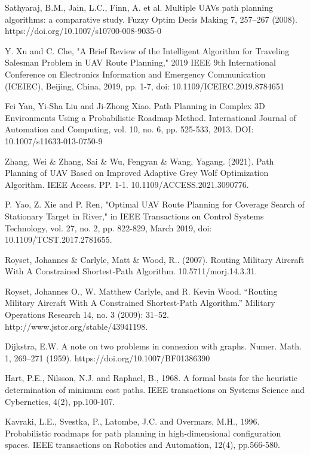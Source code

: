 \documentclass[conference]{IEEEtran}
\begin{document}
\begin{thebibliography}{00}

 Sathyaraj, B.M., Jain, L.C., Finn, A. et al. Multiple UAVs path planning algorithms: a comparative study. Fuzzy Optim Decis Making 7, 257–267 (2008). https://doi.org/10.1007/s10700-008-9035-0

 Y. Xu and C. Che, "A Brief Review of the Intelligent Algorithm for Traveling Salesman Problem in UAV Route Planning," 2019 IEEE 9th International Conference on Electronics Information and Emergency Communication (ICEIEC), Beijing, China, 2019, pp. 1-7, doi: 10.1109/ICEIEC.2019.8784651

 Fei Yan, Yi-Sha Liu and Ji-Zhong Xiao. Path Planning in Complex 3D Environments Using a Probabilistic Roadmap Method. International Journal of Automation and Computing, vol. 10, no. 6, pp. 525-533, 2013. DOI:  10.1007/s11633-013-0750-9

 Zhang, Wei \& Zhang, Sai \& Wu, Fengyan \& Wang, Yagang. (2021). Path Planning of UAV Based on Improved Adaptive Grey Wolf Optimization Algorithm. IEEE Access. PP. 1-1. 10.1109/ACCESS.2021.3090776. 

 P. Yao, Z. Xie and P. Ren, "Optimal UAV Route Planning for Coverage Search of Stationary Target in River," in IEEE Transactions on Control Systems Technology, vol. 27, no. 2, pp. 822-829, March 2019, doi: 10.1109/TCST.2017.2781655.

 Royset, Johannes \& Carlyle, Matt \& Wood, R.. (2007). Routing Military Aircraft With A Constrained Shortest-Path Algorithm. 10.5711/morj.14.3.31. 

 Royset, Johannes O., W. Matthew Carlyle, and R. Kevin Wood. “Routing Military Aircraft With A Constrained Shortest-Path Algorithm.” Military Operations Research 14, no. 3 (2009): 31–52. http://www.jstor.org/stable/43941198.

 Dijkstra, E.W. A note on two problems in connexion with graphs. Numer. Math. 1, 269–271 (1959). https://doi.org/10.1007/BF01386390

 Hart, P.E., Nilsson, N.J. and Raphael, B., 1968. A formal basis for the heuristic determination of minimum cost paths. IEEE transactions on Systems Science and Cybernetics, 4(2), pp.100-107.

 Kavraki, L.E., Svestka, P., Latombe, J.C. and Overmars, M.H., 1996. Probabilistic roadmaps for path planning in high-dimensional configuration spaces. IEEE transactions on Robotics and Automation, 12(4), pp.566-580.


\end{thebibliography}
\end{document}
